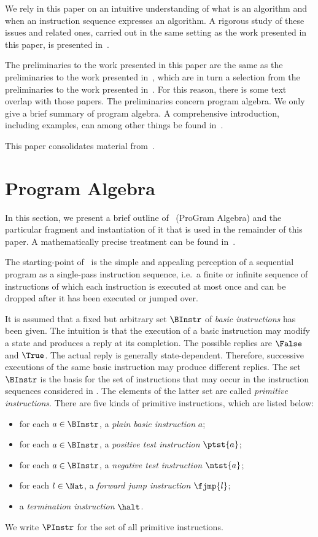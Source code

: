 \documentclass{llncs}
\begin{document}
We rely in this paper on an intuitive understanding of what is an 
algorithm and when an instruction sequence expresses an algorithm.
A rigorous study of these issues and related ones, carried out in the 
same setting as the work presented in this paper, is presented 
in~\cite{BM14a}.

The preliminaries to the work presented in this paper are the same as 
the preliminaries to the work presented in~\cite{BM13b}, which are in
turn a selection from the preliminaries to the work presented 
in~\cite{BM13a}.
For this reason, there is some text overlap with those papers.
The preliminaries concern program algebra.
We only give a brief summary of program algebra.
A comprehensive introduction, including examples, can among other things
be found in~\cite{BM12b}.

This paper consolidates material from~\cite{BM13c,BM13d}.

\section{Program Algebra}
\label{sect-PGA}

In this section, we present a brief outline of \PGA\ (ProGram Algebra) 
and the particular fragment and instantiation of it that is used in 
the remainder of this paper.
A mathematically precise treatment can be found in~\cite{BM13a}.

The starting-point of \PGA\ is the simple and appealing perception
of a sequential program as a single-pass instruction sequence, i.e.\ a
finite or infinite sequence of instructions of which each instruction is
executed at most once and can be dropped after it has been executed or
jumped over.

It is assumed that a fixed but arbitrary set $\BInstr$ of
\emph{basic instructions} has been given.
The intuition is that the execution of a basic instruction may modify a 
state and produces a reply at its completion.
The possible replies are $\False$ and $\True$.
The actual reply is generally state-dependent.
Therefore, successive executions of the same basic instruction may
produce different replies.
The set $\BInstr$ is the basis for the set of instructions that may 
occur in the instruction sequences considered in \PGA.
The elements of the latter set are called \emph{primitive instructions}.
There are five kinds of primitive instructions, which are listed below:
\begin{itemize}
\item
for each $a \in \BInstr$, a \emph{plain basic instruction} $a$;
\item
for each $a \in \BInstr$, a \emph{positive test instruction} $\ptst{a}$;
\item
for each $a \in \BInstr$, a \emph{negative test instruction} $\ntst{a}$;
\item
for each $l \in \Nat$, a \emph{forward jump instruction} $\fjmp{l}$;
\item
a \emph{termination instruction} $\halt$.
\end{itemize}
We write $\PInstr$ for the set of all primitive instructions.
\end{document}
